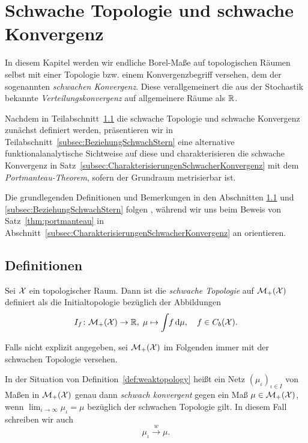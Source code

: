 \documentclass[../main/main.tex]{subfiles}
\begin{document}
	
	\section{Schwache Topologie und schwache Konvergenz}
	
	In diesem Kapitel werden wir endliche Borel-Maße auf topologischen Räumen selbst
	mit einer Topologie bzw. einem Konvergenzbegriff versehen, dem der sogenannten \emph{schwachen Konvergenz}. Diese
	verallgemeinert die aus der Stochastik bekannte \emph{Verteilungskonvergenz} auf allgemeinere Räume als $\mathbb{R}$. 
	
	Nachdem in Teilabschnitt~\ref{subsec:Definition} die schwache Topologie und schwache Konvergenz zunächst definiert werden, präsentieren wir in Teilabschnitt~\ref{subsec:BeziehungSchwachStern}
	eine alternative funktionalanalytische Sichtweise auf diese und charakterisieren die schwache Konvergenz in Satz~\ref{subsec:CharakterisierungenSchwacherKonvergenz} mit dem \emph{Portmanteau-Theorem},
	sofern der Grundraum metrisierbar ist.
	
	Die grundlegenden Definitionen und Bemerkungen in den Abschnitten \ref{subsec:Definition} und \ref{subsec:BeziehungSchwachStern} folgen 
	\cite[Abschnitte 1-3]{Varadarajan.1958}, während wir uns beim Beweis von Satz~\ref{thm:portmanteau} in Abschnitt~\ref{subsec:CharakterisierungenSchwacherKonvergenz}
	an \cite[Satz 4.14.4]{Simon.2015} orientieren.

	\subsection{Definitionen}
	\label{subsec:Definition}
	
	\begin{Definition}
		\label{def:weaktopology}
		Sei $\mathcal{X}$ ein topologischer Raum. Dann ist die \emph{schwache Topologie} auf $\mathcal{M}_{+}(\mathcal{X})$ definiert als die 
		Initialtopologie bezüglich der Abbildungen
		\[ I_f \colon \mathcal{M}_{+}(\mathcal{X}) \to \mathbb{R}, \; \mu \mapsto \int_{} \, f \, \mathrm{d}\mu , \quad f \in C_b(\mathcal{X}) \text{.} \]
	\end{Definition}

	Falls nicht explizit angegeben, sei $\mathcal{M}_{+}(\mathcal{X})$ im Folgenden immer mit der schwachen Topologie versehen.

	\begin{Definition}
		In der Situation von Definition~\ref{def:weaktopology} heißt ein Netz $(\mu_\iota)_{\iota \in I}$ von Maßen in $\mathcal{M}_{+}(\mathcal{X})$ genau dann 
		\emph{schwach konvergent} gegen ein Maß $\mu \in \mathcal{M}_{+}(\mathcal{X})$, wenn $\lim_{\iota \to \infty} \mu_\iota = \mu$ bezüglich der schwachen Topologie gilt.
		In diesem Fall schreiben wir auch
		\[ \mu_\iota \xrightarrow{w} \mu \text{.} \]
	\end{Definition}
\end{document}

